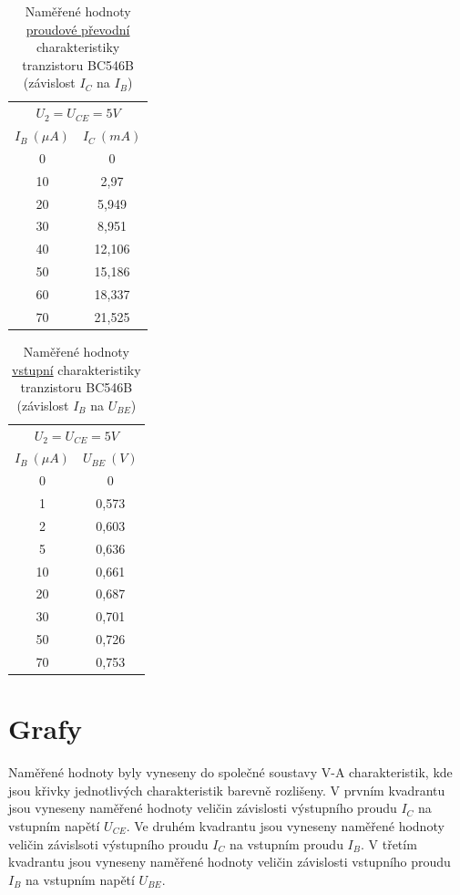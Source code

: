 \documentclass[a4paper, czech]{article}
\begin{document}
\begin{table}[H]
    \centering
    \begin{tabular}{cc}
        \toprule
        \multicolumn{2}{c}{$U_2 = U_{CE} = 5V$} \\
        $I_B\ (\mu A)$ & $I_C\ (mA)$ \\
        \midrule
        0  & 0      \\
        10 & 2,97   \\
        20 & 5,949  \\
        30 & 8,951  \\
        40 & 12,106 \\
        50 & 15,186 \\
        60 & 18,337 \\
        70 & 21,525 \\
        \bottomrule
    \end{tabular}
    \caption{Naměřené hodnoty \underline{proudové převodní} charakteristiky tranzistoru BC546B (závislost $I_C$ na $I_B$)}
    \label{tab:1}
\end{table}

\begin{table}[H]
    \centering
    \begin{tabular}{cc}
        \toprule
        \multicolumn{2}{c}{$U_2 = U_{CE} = 5V$} \\
        $I_B\ (\mu A)$ & $U_{BE}\ (V)$ \\
        \midrule
        0  & 0     \\
        1  & 0,573 \\
        2  & 0,603 \\
        5  & 0,636 \\
        10 & 0,661 \\
        20 & 0,687 \\
        30 & 0,701 \\
        50 & 0,726 \\
        70 & 0,753 \\
        \bottomrule
    \end{tabular}
    \caption{Naměřené hodnoty \underline{vstupní} charakteristiky tranzistoru BC546B (závislost $I_B$ na $U_{BE}$)}
    \label{tab:1}
\end{table}

\section{Grafy}

Naměřené hodnoty byly vyneseny do společné soustavy V-A charakteristik, kde jsou křivky jednotlivých charakteristik barevně rozlišeny.
V prvním kvadrantu jsou vyneseny naměřené hodnoty veličin závislosti výstupního proudu $I_C$ na vstupním napětí $U_{CE}$.
Ve druhém kvadrantu jsou vyneseny naměřené hodnoty veličin závislsoti výstupního proudu $I_C$ na vstupním proudu $I_B$.
V třetím kvadrantu jsou vyneseny naměřené hodnoty veličin závislosti vstupního proudu $I_B$ na vstupním napětí $U_{BE}$.
\end{document}
